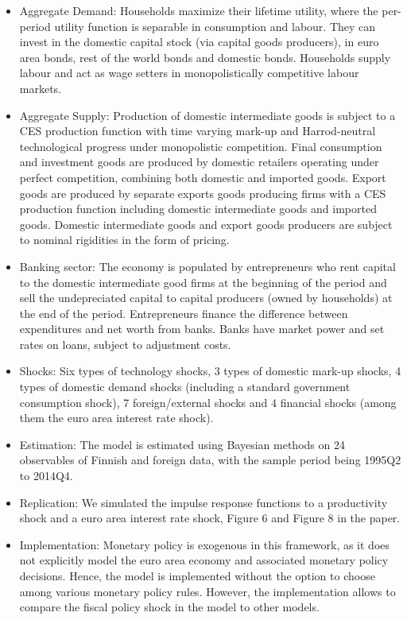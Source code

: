 \documentclass[11pt,a4paper]{article}
\begin{document}
	\begin{itemize}
		\item Aggregate Demand: Households maximize their lifetime utility, where the per-period utility function is separable in consumption and labour. They can invest in the domestic capital stock (via capital goods producers), in euro area bonds, rest of the world bonds and domestic bonds. Households supply labour and act as wage setters in monopolistically competitive labour markets. 
		
		\item Aggregate Supply: Production of domestic intermediate goods is subject to a CES production function with time varying mark-up and Harrod-neutral technological progress under monopolistic competition. Final consumption and investment goods are produced by domestic retailers operating under perfect competition, combining both domestic and imported goods. Export goods are produced by separate exports goods producing firms with a CES production function including domestic intermediate goods and imported goods. Domestic intermediate goods and export goods producers are subject to nominal rigidities in the form of \cite{Calvo1983} pricing.
		
		\item Banking sector: The economy is populated by entrepreneurs who rent capital to the domestic intermediate good firms at the beginning of the period and sell the undepreciated capital to capital producers (owned by households) at the end of the period. Entrepreneurs finance the difference between expenditures and net worth from banks. Banks have market power and set rates on loans, subject to adjustment costs.
		
		\item Shocks: Six types of technology shocks, 3 types of domestic mark-up shocks, 4 types of domestic demand shocks (including a standard government consumption shock), 7 foreign/external shocks and 4 financial shocks (among them the euro area interest rate shock).
		
		\item Estimation: The model is estimated using Bayesian methods on 24 observables of Finnish and foreign data, with the sample period being 1995Q2 to 2014Q4.
		
		\item Replication: We simulated the impulse response functions to a productivity shock and a euro area interest rate shock, Figure 6 and Figure 8 in the paper.
		
		\item Implementation: Monetary policy is exogenous in this framework, as it does not explicitly model the euro area economy and associated monetary policy decisions. Hence, the model is implemented without the option to choose among various monetary policy rules. However, the implementation allows to compare the fiscal policy shock in the model to other models.
		
	\end{itemize}
	
\end{document}
